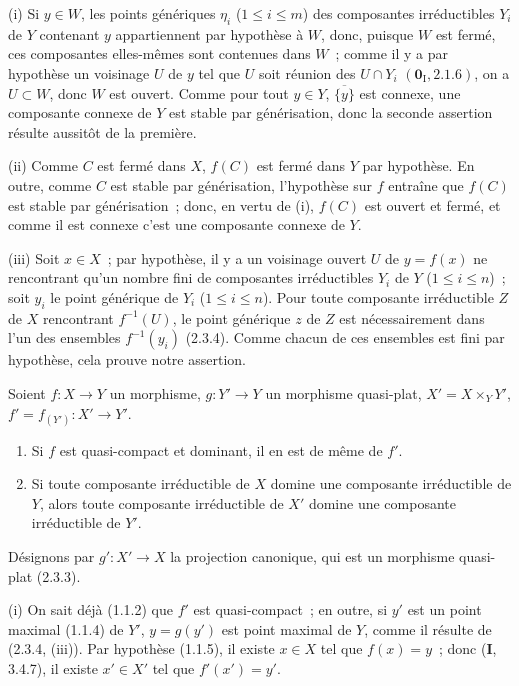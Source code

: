 (i) Si $y\in W$, les points génériques $\eta_i$ ($1\leq i\leq m$) des
composantes irréductibles $Y_i$ de $Y$ contenant $y$ appartiennent par
hypothèse à $W$, donc, puisque $W$ est fermé, ces composantes elles-mêmes sont
contenues dans $W$~; comme il y a par hypothèse un voisinage $U$ de $y$ tel que
$U$ soit réunion des $U\cap Y_i$ $(\mathbf{0}_{\mathrm I},2.1.6)$, on a
$U\subset W$, donc $W$
est ouvert. Comme pour tout $y\in Y$,
$\overline{\{y\}}$ est connexe, une composante connexe de $Y$ est stable par
générisation, donc la seconde assertion résulte aussitôt de la première.

(ii) Comme $C$ est fermé dans $X$, $f(C)$ est fermé dans $Y$ par hypothèse. En
outre, comme $C$ est stable par générisation, l'hypothèse sur $f$ entraîne que
$f(C)$ est stable par générisation~; donc, en vertu de (i), $f(C)$ est ouvert
et fermé, et comme il est connexe c'est une composante connexe de $Y$.

(iii) Soit $x\in X$~; par hypothèse, il y a un voisinage ouvert $U$ de
$y=f(x)$ ne rencontrant qu'un nombre fini de composantes irréductibles $Y_i$
de $Y$ ($1\leq i\leq n$)~; soit $y_i$ le point générique de $Y_i$
($1\leq i\leq n$). Pour toute composante irréductible $Z$ de $X$ rencontrant
$f^{-1}(U)$, le point générique $z$ de $Z$ est nécessairement dans l'un des
ensembles $f^{-1}(y_i)$ (2.3.4). Comme chacun de ces ensembles est fini par
hypothèse, cela prouve notre assertion.

\begin{proposition}[2.3.7]
\label{IV.2.3.7-fr}
Soient $f:X\to Y$ un morphisme, $g:Y'\to Y$ un morphisme quasi-plat,
$X'=X\times_Y Y'$, $f'=f_{(Y')}:X'\to Y'$.
\begin{enumerate}
  \item[\textup{(i)}] Si $f$ est quasi-compact et dominant, il en est de même de $f'$.
  \item[\textup{(ii)}] Si toute composante irréductible de $X$ domine une composante
  irréductible de $Y$, alors toute composante irréductible de $X'$ domine une
  composante irréductible de $Y'$.
\end{enumerate}
\end{proposition}

Désignons par $g':X'\to X$ la projection canonique, qui est un morphisme
quasi-plat (2.3.3).

(i) On sait déjà (1.1.2) que $f'$ est quasi-compact~; en outre, si $y'$ est un
point maximal (1.1.4) de $Y'$, $y=g(y')$ est point maximal de $Y$, comme il
résulte de (2.3.4, (iii)). Par hypothèse (1.1.5), il existe $x\in X$ tel que
$f(x)=y$~; donc (\textbf{I}, 3.4.7), il existe $x'\in X'$ tel que $f'(x')=y'$.

